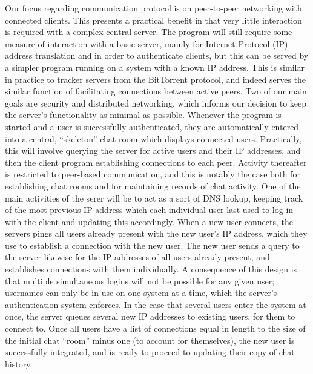 \documentclass[12pt]{report}
\begin{document}
\begin{flushleft}
\indent Our focus regarding communication protocol is on peer-to-peer networking with connected clients. This presents a practical benefit in that very little interaction is required with a complex central server. The program will still require some measure of interaction with a basic server, mainly for Internet Protocol (IP) address translation and in order to authenticate clients, but this can be served by a simpler program running on a system with a known IP address. This is similar in practice to tracker servers from the BitTorrent protocol, and indeed serves the similar function of facilitating connections between active peers. Two of our main goals are security and distributed networking, which informs our decision to keep the server's functionality as minimal as possible. Whenever the program is started and a user is successfully authenticated, they are automatically entered into a central, ``skeleton'' chat room which displays connected users. Practically, this will involve querying the server for active users and their IP addresses, and then the client program establishing connections to each peer. Activity thereafter is restricted to peer-based communication, and this is notably the case both for establishing chat rooms and for maintaining records of chat activity. One of the main activities of the serer will be to act as a sort of DNS lookup, keeping track of the most previous IP address which each individual user last used to log in with the client and updating this accordingly. When a new user connects, the servers pings all users already present with the new user's IP address, which they use to establish a connection with the new user. The new user sends a query to the server likewise for the IP addresses of all users already present, and establishes connections with them individually. A consequence of this design is that multiple simultaneous logins will not be possible for any given user; usernames can only be in use on one system at a time, which the server's authentication system enforces. In the case that several users enter the system at once, the server queues several new IP addresses to existing users, for them to connect to. Once all users have a list of connections equal in length to the size of the initial chat ``room'' minus one (to account for themselves), the new user is successfully integrated, and is ready to proceed to updating their copy of chat history.


\end{flushleft}
\end{document}
